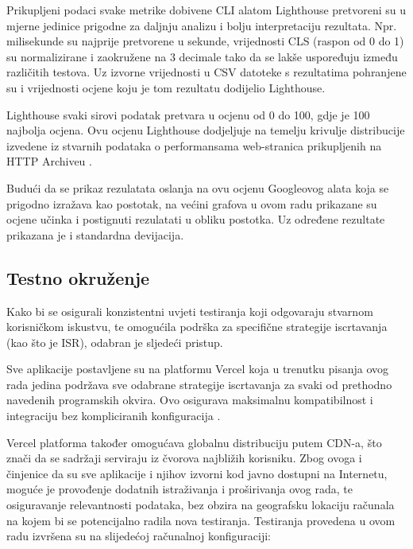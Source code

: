 Prikupljeni podaci svake metrike dobivene CLI alatom Lighthouse pretvoreni su u mjerne jedinice prigodne za daljnju analizu i bolju interpretaciju rezultata. Npr. milisekunde su najprije pretvorene u sekunde, vrijednosti CLS (raspon od 0 do 1) su normalizirane i zaokružene na 3 decimale tako da se lakše uspoređuju između različitih testova. Uz izvorne vrijednosti u CSV datoteke s rezultatima pohranjene su i vrijednosti ocjene koju je tom rezultatu dodijelio Lighthouse.

\bigskip

Lighthouse svaki sirovi podatak pretvara u ocjenu od 0 do 100, gdje je 100 najbolja ocjena. Ovu ocjenu Lighthouse dodjeljuje na temelju krivulje distribucije izvedene iz stvarnih podataka o performansama web-stranica prikupljenih na HTTP Archiveu \cite
{chrome2025lighthouse}.

\bigskip

Budući da se prikaz rezulatata oslanja na ovu ocjenu Googleovog alata koja se prigodno izražava kao postotak, na većini grafova u ovom radu prikazane su ocjene učinka i postignuti rezulatati u obliku postotka. Uz određene rezultate prikazana je i standardna devijacija.

\subsection{Testno okruženje}

Kako bi se osigurali konzistentni uvjeti testiranja koji odgovaraju stvarnom korisničkom iskustvu, te omogućila podrška za specifične strategije iscrtavanja (kao što je ISR), odabran je sljedeći pristup.

\bigskip

Sve aplikacije postavljene su na platformu Vercel koja u trenutku pisanja ovog rada jedina podržava sve odabrane strategije iscrtavanja za svaki od prethodno navedenih programskih okvira. Ovo osigurava maksimalnu kompatibilnost i integraciju bez kompliciranih konfiguracija \cite{vercelframeworks}.

\bigskip

Vercel platforma također omogućava globalnu distribuciju putem CDN-a, što znači da se sadržaji serviraju iz čvorova najbližih korisniku. Zbog ovoga i činjenice da su sve aplikacije i njihov izvorni kod javno dostupni na Internetu, moguće je provođenje dodatnih istraživanja i proširivanja ovog rada, te osiguravanje relevantnosti podataka, bez obzira na geografsku lokaciju računala na kojem bi se potencijalno radila nova testiranja.
Testiranja provedena u ovom radu izvršena su na slijedećoj računalnoj konfiguraciji:

